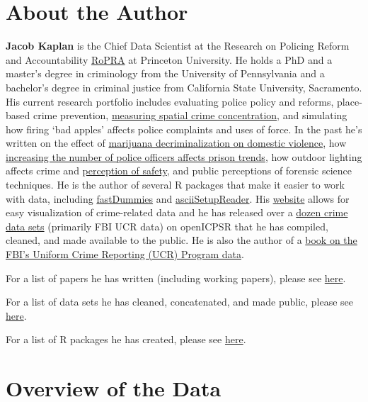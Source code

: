 \documentclass[
  12pt,
  openany]{book}
\begin{document}
\hypertarget{about-the-author}{%
\chapter*{About the Author}\label{about-the-author}}


\textbf{Jacob Kaplan} is the Chief Data Scientist at the Research on Policing Reform and Accountability \href{https://policingresearch.org/team/}{RoPRA} at Princeton University. He holds a PhD and a master's degree in criminology from the University of Pennsylvania and a bachelor's degree in criminal justice from California State University, Sacramento. His current research portfolio includes evaluating police policy and reforms, place-based crime prevention, \href{https://doi.org/10.1177/0022427820984213}{measuring spatial crime concentration}, and simulating how firing `bad apples' affects police complaints and uses of force.
In the past he's written on the effect of \href{https://doi.org/10.1177/0886260520961876}{marijuana decriminalization on domestic violence}, how \href{https://doi.org/10.1111/1745-9133.12424}{increasing the number of police officers affects prison trends}, how outdoor lighting affects crime and \href{https://link.springer.com/article/10.1057/s41284-021-00296-0}{perception of safety}, and public perceptions of forensic science techniques. He is the author of several R packages that make it easier to work with data, including \href{https://jacobkap.github.io/fastDummies/}{fastDummies} and \href{https://jacobkap.github.io/asciiSetupReader/}{asciiSetupReader}. His \href{http://jacobdkaplan.com/}{website} allows for easy visualization of crime-related data and he has released over a \href{http://jacobdkaplan.com/data.html}{dozen crime data sets} (primarily FBI UCR data) on openICPSR that he has compiled, cleaned, and made available to the public. He is also the author of a \href{https://ucrbook.com/}{book on the FBI's Uniform Crime Reporting (UCR) Program data}.

For a list of papers he has written (including working papers), please see \href{http://jacobdkaplan.com/research.html}{here}.

For a list of data sets he has cleaned, concatenated, and made public, please see \href{http://jacobdkaplan.com/data.html}{here}.

For a list of R packages he has created, please see \href{https://jacobdkaplan.com/packages.html}{here}.

\hypertarget{overview-of-the-data}{%
\chapter{Overview of the Data}\label{overview-of-the-data}}
\end{document}

